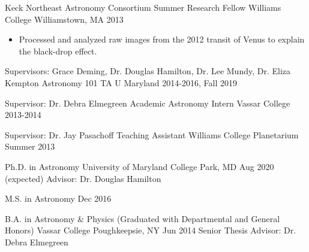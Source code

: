 \documentclass[]{awesome-cv}
\begin{document}
\begin{cventries}
	\vspace{-6mm}
	\cventry
	{Keck Northeast Astronomy Consortium Summer Research Fellow}
	{Williams College}
	{Williamstown, MA}
	{2013}
	{\vspace{-3mm}
		\begin{itemize}
			\item Processed and analyzed raw images from the 2012 transit of Venus to explain the black-drop effect.
	\end{itemize}}
\end{cventries}

\vspace{-5mm}

\begin{cventries}

	\cventry
	{Supervisors: Grace Deming, Dr. Douglas Hamilton, Dr. Lee Mundy, Dr. Eliza Kempton}
	{Astronomy 101 TA}
	{U Maryland}
	{2014-2016, Fall 2019}
	{}
		
	\vspace{-6mm}
	\cventry
	{Supervisor: Dr. Debra Elmegreen}
	{Academic Astronomy Intern}
	{Vassar College}
	{2013-2014}
	{}
		
	\vspace{-6mm}
	\cventry
	{Supervisor: Dr. Jay Pasachoff}
	{Teaching Assistant}
	{Williams College Planetarium}
	{Summer 2013}
	{}
\end{cventries}

\vspace{-5mm}

\begin{cventries}
	\cventry
	{Ph.D. in Astronomy}
	{University of Maryland}
	{College Park, MD}
	{Aug 2020 (expected)}
	{Advisor: Dr. Douglas Hamilton}
	
	\vspace{-2mm}
	\cventry
	{M.S. in Astronomy}
	{}
	{}
	{Dec 2016}
	{}
	
	\vspace{-5mm}
	\cventry
	{B.A. in Astronomy \& Physics (Graduated with Departmental and General Honors)}
	{Vassar College}
	{Poughkeepsie, NY}
	{Jun 2014}
	{Senior Thesis Advisor: Dr. Debra Elmegreen}
\end{cventries}

\end{document}
